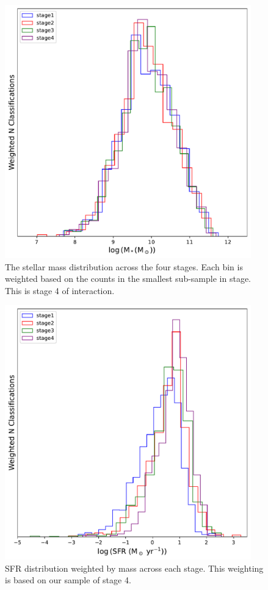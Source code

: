 \begin{figure}
    \centering
    \includegraphics[width = 0.95\textwidth]{Chapter3/figures/stellar-mass-dist.pdf}
    \caption{The stellar mass distribution across the four stages. Each bin is weighted based on the counts in the smallest sub-sample in stage. This is stage 4 of interaction.}
    \label{fig:weighted-mass}
\end{figure}

\begin{figure}
    \centering
    \includegraphics[width=0.95\textwidth]{Chapter3/figures/sfr-dist.pdf}
    \caption{SFR distribution weighted by mass across each stage. This weighting is based on our sample of stage 4.}
    \label{fig:weighted-sfr}
\end{figure}

